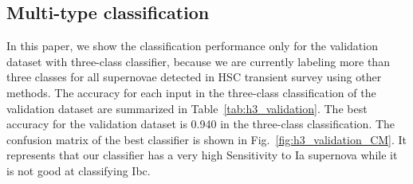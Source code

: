 \documentclass[useamsfonts]{pasj01}
\begin{document}
\subsection{Multi-type classification}
\label{sec:h3}
%
In this paper, we show the classification performance only for the validation dataset with three-class classifier, because we are currently labeling more than three classes for all supernovae detected in HSC transient survey using other methods.
%
The accuracy for each input in the three-class classification of the validation dataset are summarized in Table\ \ref{tab:h3_validation}.
The best accuracy for the validation dataset is 0.940 in the three-class classification.
The confusion matrix of the best classifier is shown in Fig.\ \ref{fig:h3_validation_CM}.
It represents that our classifier has a very high Sensitivity to Ia supernova while it is not good at classifying Ibc.
\end{document}
